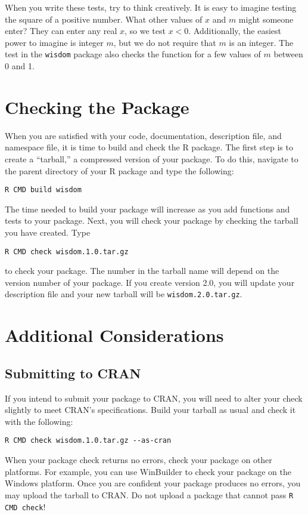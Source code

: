 \documentclass{article}
\begin{document}
 When you write these tests, try to think creatively. It is easy to imagine testing the square of a positive number. What other values of $x$ and $m$ might someone enter? They can enter any real $x$, so we test $x < 0$. Additionally, the easiest power to imagine is integer $m$, but we do not require that $m$ is an integer. The test in the \texttt{wisdom} package also checks  the function for a few values of $m$ between 0 and 1.



\section{Checking the Package}
When you are satisfied with your code, documentation, description file, and namespace file, it is time to build and check the R package. The first step is to create a ``tarball,'' a compressed version of your package. To do this, navigate to the parent directory of your R package and type the following:
\begin{verbatim}
R CMD build wisdom
\end{verbatim}
The time needed to build your package will increase as you add functions and tests to your package. Next, you will check your package by checking the tarball you have created. Type
\begin{verbatim}
R CMD check wisdom.1.0.tar.gz
\end{verbatim} 
to check your package. The number in the tarball name will depend on the version number of your package. If you create version 2.0, you will update your description file and your new tarball will be \texttt{wisdom.2.0.tar.gz}. 

\section{Additional Considerations}
\subsection{Submitting to CRAN} If you intend to submit your package to CRAN, you will need to alter your check slightly to meet CRAN's specifications. Build your tarball as usual and check it with the following:
\begin{verbatim}
R CMD check wisdom.1.0.tar.gz --as-cran
\end{verbatim}
When your package check returns no errors, check your package on other platforms. For example, you can use WinBuilder to check your package on the Windows platform. Once you are confident your package produces no errors, you may upload the tarball to CRAN. Do not upload a package that cannot pass \texttt{R CMD check}!
\end{document}
